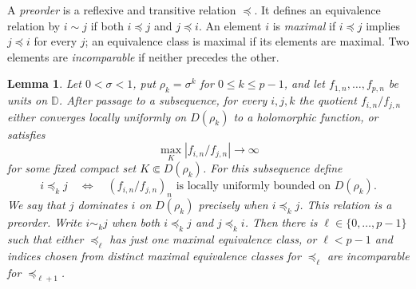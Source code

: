 \documentclass[12pt,letterpaper,reqno]{amsart}
\newtheorem{lem}[thm]{Lemma}
\theoremstyle{definition}
\numberwithin{equation}{section}
\newcommand{\D}{\mathbb D}
\begin{document}
A \emph{preorder} is a reflexive and transitive relation $\preceq$.
It defines an equivalence relation by $i\sim j$ if both $i\preceq j$
and $j\preceq i$. An element $i$ is \emph{maximal} if
$i\preceq j$ implies $j\preceq i$ for every $j$; an equivalence class
is maximal if its elements are maximal. Two elements are
\emph{incomparable} if neither precedes the other.
\begin{lem}\label{lem:stabilization}
    Let $0<\sigma<1$, put $\rho_k=\sigma^k$ for $0\le k\le p-1$,
    and let $f_{1,n},\ldots,f_{p,n}$ be units on $\D$.
    After passage to a subsequence, for every $i,j,k$ the quotient
    $f_{i,n}/f_{j,n}$ either converges locally uniformly on $D(\rho_k)$
    to a holomorphic function, or satisfies
    \[
        \max_K|f_{i,n}/f_{j,n}|\longrightarrow\infty
    \]
    for some fixed compact set $K\Subset D(\rho_k)$.
    For this subsequence define
    \[
        i\preceq_k j\quad\Longleftrightarrow\quad
        (f_{i,n}/f_{j,n})_n\text{ is locally uniformly bounded on }D(\rho_k).
    \]
    We say that $j$ \emph{dominates} $i$ on $D(\rho_k)$ precisely when
    $i\preceq_k j$. This relation is a preorder. Write $i\sim_k j$
    when both $i\preceq_k j$ and $j\preceq_k i$.
    Then there is $\ell\in\{0,\ldots,p-1\}$ such that either
    $\preceq_\ell$ has just one maximal equivalence class, or
    $\ell<p-1$ and indices chosen from distinct maximal equivalence
    classes for $\preceq_\ell$ are incomparable for $\preceq_{\ell+1}$.
\end{lem}
\end{document}

